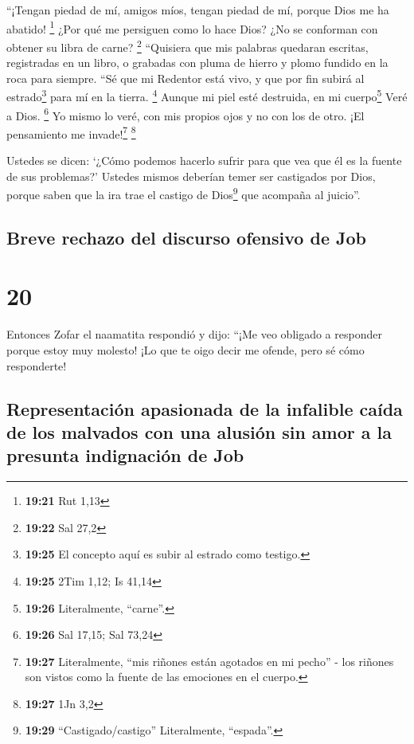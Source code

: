  ``¡Tengan piedad de mí, amigos míos, tengan piedad de
mí, porque Dios me ha abatido! \footnote{\textbf{19:21} Rut 1,13}
 ¿Por qué me persiguen como lo hace Dios? ¿No se
conforman con obtener su libra de carne? \footnote{\textbf{19:22} Sal
  27,2}  ``Quisiera que mis palabras quedaran escritas,
registradas en un libro,  o grabadas con pluma de hierro
y plomo fundido en la roca para siempre.  ``Sé que mi
Redentor está vivo, y que por fin subirá al estrado\footnote{\textbf{19:25}
  El concepto aquí es subir al estrado como testigo.} para mí en la
tierra. \footnote{\textbf{19:25} 2Tim 1,12; Is 41,14} 
Aunque mi piel esté destruida, en mi cuerpo\footnote{\textbf{19:26}
  Literalmente, ``carne''.} Veré a Dios. \footnote{\textbf{19:26} Sal
  17,15; Sal 73,24}  Yo mismo lo veré, con mis propios
ojos y no con los de otro. ¡El pensamiento me invade!\footnote{\textbf{19:27}
  Literalmente, ``mis riñones están agotados en mi pecho'' - los riñones
  son vistos como la fuente de las emociones en el cuerpo.} \footnote{\textbf{19:27}
  1Jn 3,2}

 Ustedes se dicen: `¿Cómo podemos hacerlo sufrir para que
vea que él es la fuente de sus problemas?'  Ustedes
mismos deberían temer ser castigados por Dios, porque saben que la ira
trae el castigo de Dios\footnote{\textbf{19:29} ``Castigado/castigo''
  Literalmente, ``espada''.} que acompaña al juicio''.

\hypertarget{breve-rechazo-del-discurso-ofensivo-de-job}{%
\subsection{Breve rechazo del discurso ofensivo de
Job}\label{breve-rechazo-del-discurso-ofensivo-de-job}}

\hypertarget{section-19}{%
\section{20}\label{section-19}}

 Entonces Zofar el naamatita respondió y dijo:
 ``¡Me veo obligado a responder porque estoy muy molesto!
 ¡Lo que te oigo decir me ofende, pero sé cómo
responderte!

\hypertarget{representaciuxf3n-apasionada-de-la-infalible-cauxedda-de-los-malvados-con-una-alusiuxf3n-sin-amor-a-la-presunta-indignaciuxf3n-de-job}{%
\subsection{Representación apasionada de la infalible caída de los
malvados con una alusión sin amor a la presunta indignación de
Job}\label{representaciuxf3n-apasionada-de-la-infalible-cauxedda-de-los-malvados-con-una-alusiuxf3n-sin-amor-a-la-presunta-indignaciuxf3n-de-job}}

